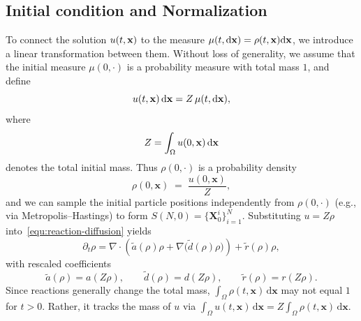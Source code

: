 \documentclass[preprint,12pt]{elsarticle}
\theoremstyle{definition}
\theoremstyle{remark}
\begin{document}
\subsection{Initial condition and Normalization}
To connect the solution $u(t,\mathbf{x})$ to the measure $\mu(t,\mathrm{d}\mathbf{x})=\rho(t,\mathbf{x}) \mathrm{d} \mathbf{x}$, we introduce a linear transformation between them. 
Without loss of generality, we assume that the initial measure $\mu(0,\cdot)$ is a probability measure with total mass $1$, and define
\begin{equation*}
    u(t,\mathbf{x})\,\mathrm{d}\mathbf{x} = Z \,\mu(t,\mathrm{d}\mathbf{x}),
\end{equation*}
where 
\[
Z = \int_{\Omega} u(0,\mathbf{x})\,\mathrm{d}\mathbf{x}
\]
denotes the total initial mass.
Thus $\rho(0,\cdot)$ is a probability density
\[
\rho(0,\mathbf{x}) \;=\; \frac{u(0,\mathbf{x})}{Z},
\]
and we can sample the initial particle positions independently from $\rho(0,\cdot)$ (e.g., via Metropolis–Hastings) to form $S(N,0)=\{\mathbf{X}^i_0\}_{i=1}^N$. 
Substituting $u=Z\rho$ into~\eqref{equ:reaction-diffusion}  yields
\begin{equation}\label{equ:normalized_diffusion_reaction}
\partial_t \rho 
= \nabla \cdot \left( \tilde a(\rho)\rho + \nabla \big(\tilde d(\rho)\rho \big)\right) 
  + \tilde r(\rho)\rho,
\end{equation}
with rescaled coefficients
\[
\tilde a(\rho) = a(Z\rho), 
\qquad \tilde d(\rho) = d(Z\rho), 
\qquad \tilde r(\rho) = r(Z\rho).
\]
Since reactions generally change the total mass, $\int_{\Omega}\rho(t,\mathbf{x})\,\mathrm{d}\mathbf{x}$ may not equal $1$ for $t>0$. Rather, it tracks the mass of $u$ via $\int_{\Omega} u(t,\mathbf{x})\,\mathrm{d}\mathbf{x} = Z \int_{\Omega} \rho(t,\mathbf{x})\,\mathrm{d}\mathbf{x}$.
\end{document}
